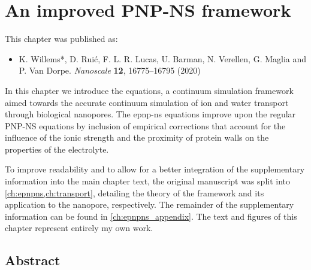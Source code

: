 \chapter{An improved PNP-NS framework}
%
\label{ch:epnpns}
%


%
%
\begin{shaded}
This chapter was published as:
%
\begin{itemize}
  \item K. Willems*, D. Rui\'{c}, F. L. R. Lucas, U. Barman, N. Verellen, G. Maglia and P. Van Dorpe.
        \textit{Nanoscale} \textbf{12}, 16775--16795 (2020) %
\end{itemize}
%
\newpage
\end{shaded}
%
%


In this chapter we introduce the  equations, a continuum simulation framework aimed towards
the accurate continuum simulation of ion and water transport through biological nanopores. The \gls{epnp-ns}
equations improve upon the regular {PNP-NS} equations by inclusion of empirical corrections that account for
the influence of the ionic strength and the proximity of protein walls on the properties of the electrolyte.
%

%
To improve readability and to allow for a better integration of the supplementary information into the main
chapter text, the original manuscript was split into \cref{ch:epnpns,ch:transport}, detailing the theory of
the framework and its application to the  nanopore, respectively. The remainder of the
supplementary information can be found in \cref{ch:epnpns_appendix}. The text and figures of this chapter
represent entirely my own work.
%

%
%
%


\section{Abstract}
%
\label{sec:epnpns:abstract}
%

